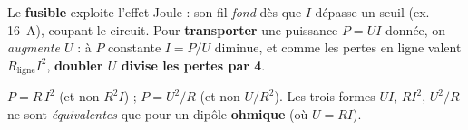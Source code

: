 \documentclass[11pt,a4paper]{article}
\begin{document}
\begin{remarque}
Le \textbf{fusible} exploite l'effet Joule : son fil \emph{fond} dès que $I$ dépasse un seuil (ex.
\qty{16}{\ampere}), coupant le circuit. Pour \textbf{transporter} une puissance $P=UI$ donnée, on
\emph{augmente $U$} : à $P$ constante $I=P/U$ diminue, et comme les pertes en ligne valent
$R_{\text{ligne}}I^{2}$, \textbf{doubler $U$ divise les pertes par 4}.
\end{remarque}

\begin{piege}
$P=R\,I^{2}$ (et non $R^2 I$) ; $P=U^{2}/R$ (et non $U/R^2$). Les trois formes $UI$, $RI^2$,
$U^2/R$ ne sont \emph{équivalentes} que pour un dipôle \textbf{ohmique} (où $U=RI$).
\end{piege}
\end{document}
